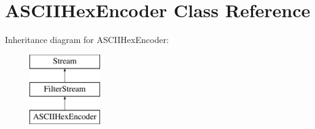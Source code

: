 \hypertarget{class_a_s_c_i_i_hex_encoder}{}\section{A\+S\+C\+I\+I\+Hex\+Encoder Class Reference}
\label{class_a_s_c_i_i_hex_encoder}
Inheritance diagram for A\+S\+C\+I\+I\+Hex\+Encoder\+:\begin{figure}[H]
\begin{center}
\leavevmode
\includegraphics[height=3.000000cm]{class_a_s_c_i_i_hex_encoder}
\end{center}
\end{figure}
